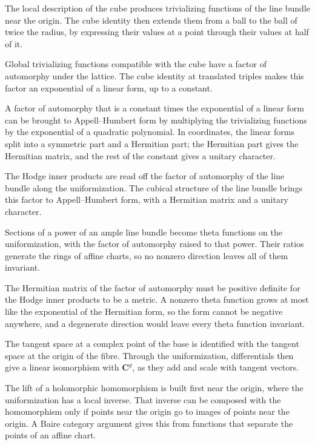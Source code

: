 The local description of the cube produces trivializing functions of the line bundle near the origin. The cube identity then
extends them from a ball to the ball of twice the radius, by expressing their values at a point through their values at
half of it.

Global trivializing functions compatible with the cube have a factor of automorphy under the lattice. The cube identity at translated
triples makes this factor an exponential of a linear form, up to a constant.

A factor of automorphy that is a constant times the exponential of a linear form can be brought to Appell--Humbert form by
multiplying the trivializing functions by the exponential of a quadratic polynomial. In coordinates, the linear forms split
into a symmetric part and a Hermitian part; the Hermitian part gives the Hermitian matrix, and the rest of the constant
gives a unitary character.

The Hodge inner products are read off the factor of automorphy of the line bundle along the uniformization. The cubical
structure of the line bundle brings this factor to Appell--Humbert form, with a Hermitian matrix and a unitary character.

Sections of a power of an ample line bundle become theta functions on the uniformization, with the factor of automorphy raised
to that power. Their ratios generate the rings of affine charts, so no nonzero direction leaves all of them invariant.

The Hermitian matrix of the factor of automorphy must be positive definite for the Hodge inner products to be a metric. A
nonzero theta function grows at most like the exponential of the Hermitian form, so the form cannot be negative anywhere,
and a degenerate direction would leave every theta function invariant.

The tangent space at a complex point of the base is identified with the tangent space at the origin of the fibre. Through the
uniformization, differentials then give a linear isomorphism with $\mathbf C^g$, as they add and scale with tangent vectors.

The lift of a holomorphic homomorphism is built first near the origin, where the uniformization has a local inverse. That
inverse can be composed with the homomorphism only if points near the origin go to images of points near the origin. A
Baire category argument gives this from functions that separate the points of an affine chart.

